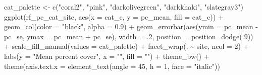 \documentclass[
]{article}
\newenvironment{Shaded}{\begin{snugshade}}{\end{snugshade}}
\newcommand{\AttributeTok}[1]{\textcolor[rgb]{0.77,0.63,0.00}{#1}}
\newcommand{\DecValTok}[1]{\textcolor[rgb]{0.00,0.00,0.81}{#1}}
\newcommand{\FloatTok}[1]{\textcolor[rgb]{0.00,0.00,0.81}{#1}}
\newcommand{\FunctionTok}[1]{\textcolor[rgb]{0.00,0.00,0.00}{#1}}
\newcommand{\NormalTok}[1]{#1}
\newcommand{\OtherTok}[1]{\textcolor[rgb]{0.56,0.35,0.01}{#1}}
\newcommand{\SpecialCharTok}[1]{\textcolor[rgb]{0.00,0.00,0.00}{#1}}
\newcommand{\StringTok}[1]{\textcolor[rgb]{0.31,0.60,0.02}{#1}}
\begin{document}
\begin{Shaded}
\begin{Highlighting}[]
\NormalTok{cat\_palette }\OtherTok{\textless{}{-}} \FunctionTok{c}\NormalTok{(}\StringTok{"coral2"}\NormalTok{, }\StringTok{"pink"}\NormalTok{, }\StringTok{"darkolivegreen"}\NormalTok{, }\StringTok{"darkkhaki"}\NormalTok{, }\StringTok{"slategray3"}\NormalTok{)}
\FunctionTok{ggplot}\NormalTok{(rf\_pc\_cat\_site, }
       \FunctionTok{aes}\NormalTok{(}\AttributeTok{x =}\NormalTok{ cat\_c, }\AttributeTok{y =}\NormalTok{ pc\_mean, }\AttributeTok{fill =}\NormalTok{ cat\_c)) }\SpecialCharTok{+}
  \FunctionTok{geom\_col}\NormalTok{(}\AttributeTok{color =} \StringTok{"black"}\NormalTok{, }\AttributeTok{alpha =} \FloatTok{0.9}\NormalTok{) }\SpecialCharTok{+}
  \FunctionTok{geom\_errorbar}\NormalTok{(}\FunctionTok{aes}\NormalTok{(}\AttributeTok{ymin =}\NormalTok{ pc\_mean }\SpecialCharTok{{-}}\NormalTok{ pc\_se, }\AttributeTok{ymax =}\NormalTok{ pc\_mean }\SpecialCharTok{+}\NormalTok{ pc\_se), }\AttributeTok{width =}\NormalTok{ .}\DecValTok{2}\NormalTok{,}
                 \AttributeTok{position =} \FunctionTok{position\_dodge}\NormalTok{(.}\DecValTok{9}\NormalTok{)) }\SpecialCharTok{+}
  \FunctionTok{scale\_fill\_manual}\NormalTok{(}\AttributeTok{values =}\NormalTok{ cat\_palette) }\SpecialCharTok{+}
  \FunctionTok{facet\_wrap}\NormalTok{(. }\SpecialCharTok{\textasciitilde{}}\NormalTok{ site, }\AttributeTok{ncol =} \DecValTok{2}\NormalTok{) }\SpecialCharTok{+}
  \FunctionTok{labs}\NormalTok{(}\AttributeTok{y =} \StringTok{"Mean percent cover"}\NormalTok{, }\AttributeTok{x =} \StringTok{""}\NormalTok{, }\AttributeTok{fill =} \StringTok{""}\NormalTok{) }\SpecialCharTok{+}
  \FunctionTok{theme\_bw}\NormalTok{() }\SpecialCharTok{+}
  \FunctionTok{theme}\NormalTok{(}\AttributeTok{axis.text.x =} \FunctionTok{element\_text}\NormalTok{(}\AttributeTok{angle =} \DecValTok{45}\NormalTok{, }\AttributeTok{h =} \DecValTok{1}\NormalTok{, }\AttributeTok{face =} \StringTok{"italic"}\NormalTok{))}
\end{Highlighting}
\end{Shaded}
\end{document}
